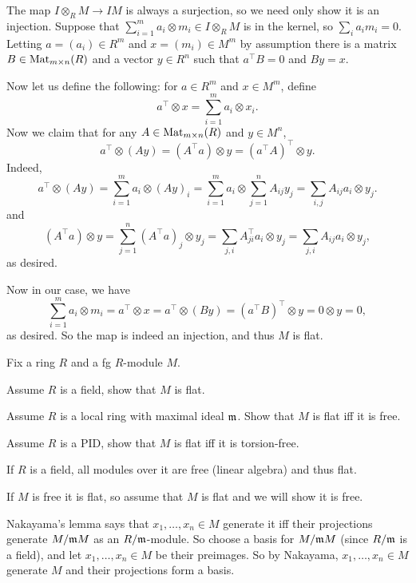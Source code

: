     \item The map $I\otimes_RM\to IM$ is always a surjection, so we need only show it is an injection.
    Suppose that $\sum_{i=1}^ma_i\otimes m_i\in I\otimes_RM$ is in the kernel, so $\sum_ia_im_i=0$.
    Letting $a=(a_i)\in R^m$ and $x=(m_i)\in M^m$ by assumption there is a matrix $B\in{\rm Mat}_{m\times n}(R)$ and a vector $y\in R^n$ such that $a^\top B=0$ and $By=x$.

    Now let us define the following: for $a\in R^m$ and $x\in M^m$, define
    $$ a^\top \otimes x = \sum_{i=1}^m a_i\otimes x_i . $$
    Now we claim that for any $A\in{\rm Mat}_{m\times n}(R)$ and $y\in M^n$,
    $$ a^\top \otimes(Ay) = (A^\top a)\otimes y = (a^\top A)^\top\otimes y. $$
    Indeed,
    $$ a^\top \otimes(Ay) = \sum_{i=1}^m a_i\otimes(Ay)_i = \sum_{i=1}^m a_i\otimes\sum_{j=1}^n A_{ij}y_j = \sum_{i,j} A_{ij}a_i\otimes y_j . $$
    and
    $$ (A^\top a)\otimes y = \sum_{j=1}^n(A^\top a)_j\otimes y_j = \sum_{j,i} A^\top_{ji}a_i\otimes y_j = \sum_{j,i}A_{ij}a_i\otimes y_j , $$
    as desired.

    Now in our case, we have
    $$ \sum_{i=1}^m a_i\otimes m_i = a^\top \otimes x = a^\top \otimes (By) = (a^\top B)^\top\otimes y = 0\otimes y = 0 , $$
    as desired.
    So the map is indeed an injection, and thus $M$ is flat.
\eenum

\bprob

    Fix a ring $R$ and a fg $R$-module $M$.
    \benum
        \item Assume $R$ is a field, show that $M$ is flat.
        \item Assume $R$ is a local ring with maximal ideal ${{\frak m}}$.
        Show that $M$ is flat iff it is free.
        \item Assume $R$ is a PID, show that $M$ is flat iff it is torsion-free.
    \eenum

\eprob

\benum
    \item If $R$ is a field, all modules over it are free (linear algebra) and thus flat.

    \item If $M$ is free it is flat, so assume that $M$ is flat and we will show it is free.

    Nakayama's lemma says that $x_1,\dots,x_n\in M$ generate it iff their projections generate $M/{{\frak m}} M$ as an $R/{{\frak m}}$-module.
    So choose a basis for $M/{{\frak m}} M$ (since $R/{{\frak m}}$ is a field), and let $x_1,\dots,x_n\in M$ be their preimages.
    So by Nakayama, $x_1,\dots,x_n\in M$ generate $M$ and their projections form a basis.

